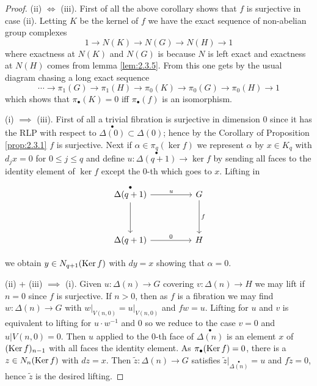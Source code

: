 \documentclass[../main]{subfiles}
\begin{document}
\begin{proof}
(ii) $\iff$ (iii). First of all the above corollary shows that $f$ is surjective in case (ii). Letting $K$ be the kernel of $f$ we have the exact sequence of non-abelian group complexes
    \[ 1 \longrightarrow N(K) \longrightarrow N(G) \longrightarrow N(H) \longrightarrow 1 \] 
where exactness at $N(K)$ and $N(G)$ is because $N$ is left exact and exactness at $N(H)$ comes from lemma \ref{lem:2.3.5}. From this one gets by the usual diagram chasing a long exact sequence
    \[ \cdots \longrightarrow \pi_{1}(G) \longrightarrow \pi_{1}(H) \longrightarrow \pi_{0}(K) \longrightarrow \pi_{0}(G) \longrightarrow \pi_{0}(H) \longrightarrow 1 \]
which shows that $\pi_{\bullet}(K) = 0$ iff $\pi_{\bullet}(f)$ is an isomorphism.

(i) $\implies$ (iii). First of all a trivial fibration is surjective in dimension $0$ since it has the RLP with respect to $\overset{\bullet}{\Delta(0)} \subset \Delta(0)$; hence by the Corollary of Proposition \ref{prop:2.3.1} $f$ is surjective. Next if $\alpha \in \pi_{q}(\ker f)$ we represent $\alpha$ by $x \in K_{q}$ with $d_{j}x = 0$ for $0 \leq j \leq q$ and define $u : \overset{\bullet}{\Delta(q+1)} \longrightarrow \ker f$ by sending all faces to the identity element of $\ker f$ except the $0$-th which goes to $x$. Lifting in
\[\begin{tikzcd}
	{\overset{\bullet}{\Delta(q+1)}} && G \\ \\
	{\Delta (q+1)} && H
	\arrow["u", from=1-1, to=1-3]
	\arrow["0", from=3-1, to=3-3]
	\arrow["f", from=1-3, to=3-3]
	\arrow[from=1-1, to=3-1]
\end{tikzcd}\]

we obtain $y \in N_{q+1} (\operatorname{Ker} f)$ with $dy=x$ showing that $\alpha = 0$.

(ii) + (iii) $\implies$ (i). Given $u \colon \Delta (n) \to G$ covering $v \colon \Delta (n) \to H$ we may lift if $n= 0$ since $f$ is surjective. If $n > 0$, then as $f$ is a fibration we may find $w \colon \Delta (n) \to G$ with $w\vert_{V(n,0)} = u \vert_{V(n,0)}$ and $fw=u$. Lifting for $u$ and $v$ is equivalent to lifting for $u \cdot w^{-1}$ and $0$ so we reduce to the case $v = 0$ and $u | V(n, 0) = 0$. Then $u$ applied to the $0$-th face of $\overset{\bullet}{\Delta(n)}$ is an element $x$ of $(\operatorname{Ker} f)_{n-1}$ with all faces the identity element. As $\pi_{\bullet} (\operatorname{Ker} f) = 0$, there is a $z \in N_n (\operatorname{Ker} f)$ with $dz = x$. Then $\tilde{z} \colon \Delta (n) \to G$ satisfies $\tilde{z} \vert_{\overset{\bullet}{\Delta(n)}} = u$ and $f \tilde{z} = 0$, hence $\tilde{z}$ is the desired lifting.
\end{proof}
\end{document}
